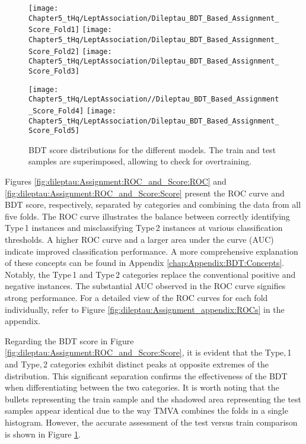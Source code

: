 \begin{figure}[htbp!]
\centering
\texttt{[image: Chapter5\_tHq/LeptAssociation/Dileptau\_BDT\_Based\_Assignment\_Score\_Fold1]}\quad
\texttt{[image: Chapter5\_tHq/LeptAssociation/Dileptau\_BDT\_Based\_Assignment\_Score\_Fold2]}
\medskip
\texttt{[image: Chapter5\_tHq/LeptAssociation/Dileptau\_BDT\_Based\_Assignment\_Score\_Fold3]}\quad

\texttt{[image: Chapter5\_tHq/LeptAssociation//Dileptau\_BDT\_Based\_Assignment\_Score\_Fold4]}
\medskip
\texttt{[image: Chapter5\_tHq/LeptAssociation/Dileptau\_BDT\_Based\_Assignment\_Score\_Fold5]}
\caption{BDT score distributions for the different models. The train and test samples 
are superimposed, allowing to check for overtraining.}
\label{fig:dileptau:Assignment_appendix:ScoreDistributions}
\end{figure}



Figures \ref{fig:dileptau:Assignment:ROC_and_Score:ROC} and 
\ref{fig:dileptau:Assignment:ROC_and_Score:Score} present the 
ROC curve and BDT score, respectively, separated by categories and 
combining the data from all five folds. The ROC curve illustrates the 
balance between correctly identifying Type$\,$1 instances and misclassifying 
Type$\,$2 instances at various classification thresholds. A higher ROC 
curve and a larger area under the curve (AUC) indicate improved 
classification performance. A more comprehensive explanation of these 
concepts can be found in Appendix \ref{chap:Appendix:BDT:Concepts}. 
Notably, the Type$\,$1 and Type$\,$2 categories replace the conventional 
positive and negative instances. The substantial AUC observed in the ROC 
curve signifies strong performance. For a detailed view of the ROC curves for
each fold individually, refer to Figure \ref{fig:dileptau:Assignment_appendix:ROCs}
in the appendix.

Regarding the BDT score in Figure \ref{fig:dileptau:Assignment:ROC_and_Score:Score}, 
it is evident that the Type$,$1 and Type$,$2 categories exhibit distinct peaks at opposite 
extremes of the distribution. This significant separation confirms the effectiveness of the 
BDT when differentiating between the two categories. It is worth noting that the bullets 
representing the train sample and the shadowed area representing the test samples 
appear identical due to the way TMVA combines the folds in a single histogram. 
However, the accurate assessment of the test versus train comparison is shown in Figure \ref{fig:dileptau:Assignment_appendix:ScoreDistributions}.

